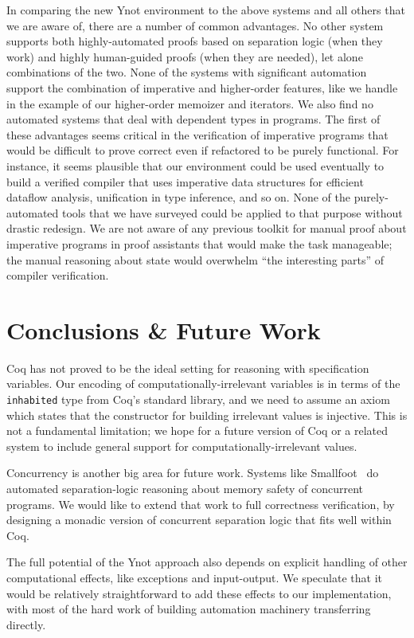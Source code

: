 \documentclass[preprint,nocopyrightspace]{sigplanconf}
\newcommand{\cd}[1]{\texttt{#1}}
\begin{document}
{In comparing the new Ynot environment to the above systems and all others that we are aware of, there are a number of common advantages.  No other system supports both highly-automated proofs based on separation logic (when they work) and highly human-guided proofs (when they are needed), let alone combinations of the two.  None of the systems with significant automation support the combination of imperative and higher-order features, like we handle in the example of our higher-order memoizer and iterators.  We also find no automated systems that deal with dependent types in programs.  The first of these advantages seems critical in the verification of imperative programs that would be difficult to prove correct even if refactored to be purely functional.  For instance, it seems plausible that our environment could be used eventually to build a verified compiler that uses imperative data structures for efficient dataflow analysis, unification in type inference, and so on.  None of the purely-automated tools that we have surveyed could be applied to that purpose without drastic redesign.  We are not aware of any previous toolkit for manual proof about imperative programs in proof assistants that would make the task manageable; the manual reasoning about state would overwhelm ``the interesting parts'' of compiler verification.


\section{Conclusions \& Future Work}

Coq has not proved to be the ideal setting for reasoning with specification variables.  Our encoding of computationally-irrelevant variables is in terms of the \cd{inhabited} type from Coq's standard library, and we need to assume an axiom which states that the constructor for building irrelevant values is injective.  This is not a fundamental limitation; we hope for a future version of Coq or a related system to include general support for computationally-irrelevant values.

Concurrency is another big area for future work.  Systems like Smallfoot~\cite{smallfoot} do automated separation-logic reasoning about memory safety of concurrent programs.  We would like to extend that work to full correctness verification, by designing a monadic version of concurrent separation logic that fits well within Coq.

The full potential of the Ynot approach also depends on explicit handling of other computational effects, like exceptions and input-output.  We speculate that it would be relatively straightforward to add these effects to our implementation, with most of the hard work of building automation machinery transferring directly.

}
\end{document}
